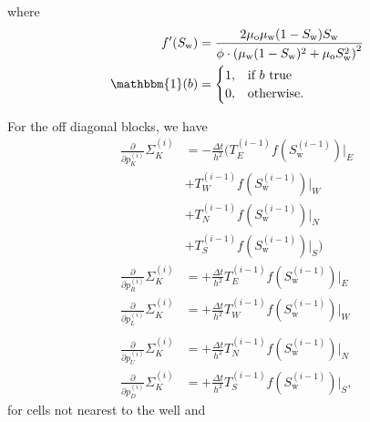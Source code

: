 \documentclass[conference]{IEEEtran}
\newcommand*{\indicator}{\ensuremath{\mathbb{1}}}
\newcommand*{\pdiff}[2]{\ensuremath{\frac{\partial}{\partial{#2}}{#1}}}
\renewcommand*{\indicator}{\ensuremath{\mathbbm{1}}}
\begin{document}
where
\begin{align}
f^\prime(S_\text{w}) &=  \frac{2\mu_\text{o}\mu_\text{w} (1 - S_\text{w})S_\text{w}}{\phi \cdot \left(\mu_\text{w}(1 - S_\text{w})^2 + \mu_\text{o}S_\text{w}^2\right)^2}\\
\indicator(b) &= \begin{cases} 1, &\text{if } b \text{ true} \\ 0, &\text{otherwise.}
\end{cases}
\end{align}

For the off diagonal blocks, we have
\begin{align}
\pdiff{\Sigma_K^{(i)}}{p_K^{(i)}} &= -\frac{\Delta t}{h^2} \biggr(T_E^{(i-1)} f(S_\text{w}^{(i-1)})\lvert_E \\&+ T_W^{(i-1)} f(S_\text{w}^{(i-1)})\lvert_W \nonumber\\&+ T_N^{(i-1)} f(S_\text{w}^{(i-1)})\lvert_N \nonumber\\&+T_S^{(i-1)}  f(S_\text{w}^{(i-1)})\lvert_S\biggr) \nonumber\\
\pdiff{\Sigma_K^{(i)}}{p_R^{(i)}} &= +\frac{\Delta t}{h^2}T_E^{(i-1)} f(S_\text{w}^{(i-1)})\lvert_E \\
\pdiff{\Sigma_K^{(i)}}{p_L^{(i)}} &= +\frac{\Delta t}{h^2}T_W^{(i-1)} f(S_\text{w}^{(i-1)})\lvert_W \\\\
\pdiff{\Sigma_K^{(i)}}{p_U^{(i)}} &= +\frac{\Delta t}{h^2}T_N^{(i-1)} f(S_\text{w}^{(i-1)})\lvert_N \\
\pdiff{\Sigma_K^{(i)}}{p_D^{(i)}} &= +\frac{\Delta t}{h^2}T_S^{(i-1)} f(S_\text{w}^{(i-1)})\lvert_S,
\end{align}
for cells not nearest to the well and
\end{document}
